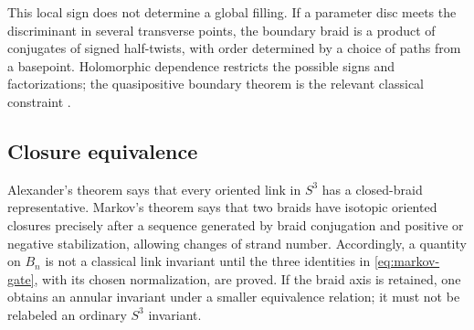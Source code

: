This local sign does not determine a global filling.  If a parameter disc meets the
discriminant in several transverse points, the boundary braid is a product of
conjugates of signed half-twists, with order determined by a choice of paths from a
basepoint.  Holomorphic dependence restricts the possible signs and factorizations;
the quasipositive boundary theorem is the relevant classical constraint
\cite{Rudolph1983AlgebraicFunctions}.

\subsection{Closure equivalence}

Alexander's theorem says that every oriented link in $S^3$ has a closed-braid
representative.  Markov's theorem says that two braids have isotopic oriented
closures precisely after a sequence generated by braid conjugation and positive or
negative stabilization, allowing changes of strand number.  Accordingly, a
quantity on $B_n$ is not a classical link invariant until the three identities in
\eqref{eq:markov-gate}, with its chosen normalization, are proved.  If the braid
axis is retained, one obtains an annular invariant under a smaller equivalence
relation; it must not be relabeled an ordinary $S^3$ invariant.
